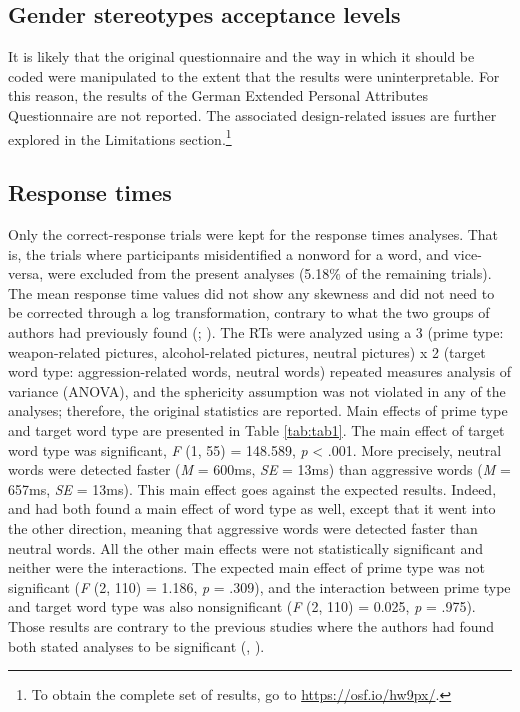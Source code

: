 \documentclass[serif, authordate, twocolumn, empirical]{jote-article}
\begin{document}
{}
\subsection*{Gender stereotypes acceptance levels}
It is likely that the original questionnaire and the way in which it should be coded were manipulated to the extent that the results were uninterpretable. For this reason, the results of the German Extended Personal Attributes Questionnaire are not reported. The associated design-related issues are further explored in the Limitations section.\footnote{ To obtain the complete set of results, go to \url{https://osf.io/hw9px/}.} 

{}
\subsection*{Response times}
Only the correct-response trials were kept for the response times analyses. That is, the trials where participants misidentified a nonword for a word, and vice-versa, were excluded from the present analyses (5.18$\%$  of the remaining trials). The mean response time values did not show any skewness and did not need to be corrected through a log transformation, contrary to what the two groups of authors had previously found (; \cite{SubraMullerBegueLBushmanDelmas2010}). The RTs were analyzed using a 3 (prime type: weapon-related pictures, alcohol-related pictures, neutral pictures) x 2 (target word type: aggression-related words, neutral words) repeated measures analysis of variance (ANOVA), and the sphericity assumption was not violated in any of the analyses; therefore, the original statistics are reported. Main effects of prime type and target word type are presented in Table \ref{tab:tab1}. The main effect of target word type was significant, \textit{F }(1, 55) = 148.589, \textit{p }< .001. More precisely, neutral words were detected faster (\textit{M }= 600ms, \textit{SE }= 13ms) than aggressive words (\textit{M }= 657ms, \textit{SE }= 13ms). This main effect goes against the expected results. Indeed, \textcite{BartholowHeinz2006} and \textcite{SubraMullerBegueLBushmanDelmas2010} had both found a main effect of word type as well, except that it went into the other direction, meaning that aggressive words were detected faster than neutral words. All the other main effects were not statistically significant and neither were the interactions. The expected main effect of prime type was not significant (\textit{F} (2, 110) = 1.186, \textit{p }= .309), and the interaction between prime type and target word type was also nonsignificant (\textit{F }(2, 110) = 0.025, \textit{p }= .975). Those results are contrary to the previous studies where the authors had found both stated analyses to be significant (, \cite{SubraMullerBegueLBushmanDelmas2010}).
\end{document}

